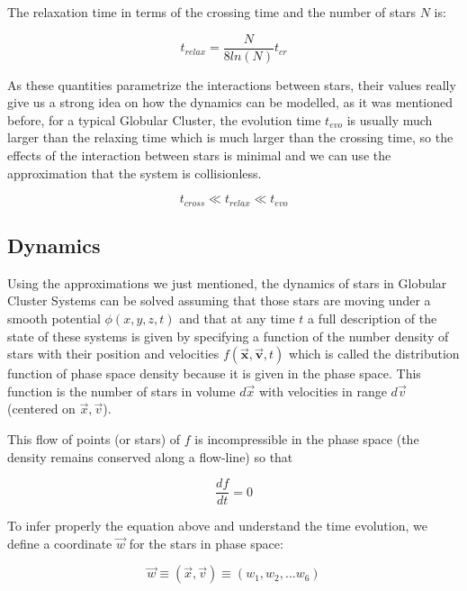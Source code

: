 The relaxation time in terms of the crossing time and the number of stars $N$ is:

\begin{equation}
t_{relax}=\frac{N}{8ln(N)}t_{cr}
\end{equation}

As these quantities parametrize the interactions between stars, their values really give us a strong idea on how the dynamics can be modelled, as it was mentioned before, for a typical Globular Cluster, the evolution time $t_{evo}$ is usually much larger than the relaxing time which is much larger than the crossing time, so the effects of the interaction between stars is minimal and we can use the approximation that the system is collisionless.

\begin{equation}
t_{cross}\ll t_{relax}\ll t_{evo}
\end{equation}

\subsection{Dynamics}

Using the approximations we just mentioned, the dynamics of stars in Globular Cluster Systems can be solved assuming that those stars are moving under a smooth potential $\phi (x,y,z,t)$ and that at any time $t$ a full description of the state of these systems is given by specifying a function of the number density of stars with their position and velocities $f(\vec{\textbf{x}},\vec{\textbf{v}},t)$ which is called the distribution function of phase space density because it is given in the phase space. This function is the number of stars in volume $d\vec{x}$ with velocities in range $d\vec{v}$ (centered on $\vec{x},\vec{v}$).

This flow of points (or stars) of $f$ is incompressible in the phase space (the density remains conserved along a flow-line) so that

\begin{equation}
\frac{df}{dt}=0
\end{equation}

To infer properly the equation above and understand the time evolution, we define a coordinate $\vec{w}$ for the stars in phase space:

\begin{equation}
\vec{w}\equiv (\vec{x},\vec{v})\equiv (w_{1},w_{2},...w_{6})
\end{equation}

